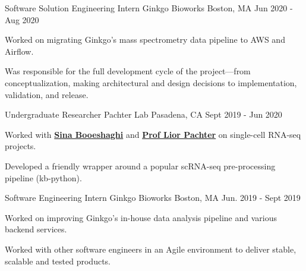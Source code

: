 

\begin{cventries}

  \cventry
    {Software Solution Engineering Intern} %
    {Ginkgo Bioworks} %
    {Boston, MA} %
    {Jun 2020 - Aug 2020} %
    {
      \begin{cvitems} %
        \item {Worked on migrating Ginkgo's mass spectrometry data pipeline to AWS and Airflow.}
        \item {Was responsible for the full development cycle of the project---from conceptualization, making architectural and design decisions to implementation, validation, and release.}
      \end{cvitems}
    }

\cventry
  {Undergraduate Researcher} %
  {Pachter Lab} %
  {Pasadena, CA} %
  {Sept 2019 - Jun 2020} %
  {
    \begin{cvitems} %
      \item {Worked with \textbf{\href{https://sinabooeshaghi.com/}{Sina Booeshaghi}} and \textbf{\href{https://pachterlab.github.io/biography.html}{Prof Lior Pachter}} on single-cell RNA-seq projects.}
      \item {Developed a friendly wrapper around a popular scRNA-seq pre-processing pipeline (kb-python).}
    \end{cvitems}
  }

  \cventry
    {Software Engineering Intern} %
    {Ginkgo Bioworks} %
    {Boston, MA} %
    {Jun. 2019 - Sept 2019} %
    {
      \begin{cvitems} %
        \item {Worked on improving Ginkgo's in-house data analysis pipeline and various backend services.}
        \item {Worked with other software engineers in an Agile environment to deliver stable, scalable and tested products.}
      \end{cvitems}
    }


\end{cventries}
